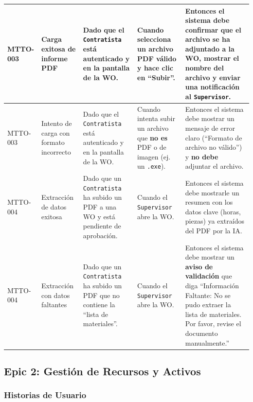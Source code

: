 \documentclass[12pt, a4paper]{article}
\begin{document}
\begin{longtable}{|p{1.8cm}|p{3cm}|p{3.5cm}|p{3.5cm}|p{3.5cm}|}
MTTO-003 & Carga exitosa de informe PDF & Dado que el \texttt{Contratista} está autenticado y en la pantalla de la WO. & Cuando selecciona un archivo PDF válido y hace clic en ``Subir''. & Entonces el sistema debe confirmar que el archivo se ha adjuntado a la WO, mostrar el nombre del archivo y enviar una notificación al \texttt{Supervisor}. \\ \hline
MTTO-003 & Intento de carga con formato incorrecto & Dado que el \texttt{Contratista} está autenticado y en la pantalla de la WO. & Cuando intenta subir un archivo que \textbf{no es} PDF o de imagen (ej. un \texttt{.exe}). & Entonces el sistema debe mostrar un mensaje de error claro (``Formato de archivo no válido'') y \textbf{no debe} adjuntar el archivo. \\ \hline
MTTO-004 & Extracción de datos exitosa & Dado que un \texttt{Contratista} ha subido un PDF a una WO y está pendiente de aprobación. & Cuando el \texttt{Supervisor} abre la WO. & Entonces el sistema debe mostrarle un resumen con los datos clave (horas, piezas) ya extraídos del PDF por la IA. \\ \hline
MTTO-004 & Extracción con datos faltantes & Dado que un \texttt{Contratista} ha subido un PDF que no contiene la ``lista de materiales''. & Cuando el \texttt{Supervisor} abre la WO. & Entonces el sistema debe mostrar un \textbf{aviso de validación} que diga ``Información Faltante: No se pudo extraer la lista de materiales. Por favor, revise el documento manualmente.'' \\ \hline
\end{longtable}

\subsection{Epic 2: Gestión de Recursos y Activos}

\subsubsection*{Historias de Usuario}
\end{document}

